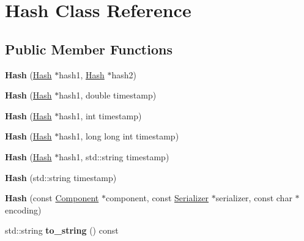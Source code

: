 \hypertarget{classHash}{}\section{Hash Class Reference}
\label{classHash}
\subsection*{Public Member Functions}
\begin{DoxyCompactItemize}
\item 
\mbox{\label{classHash_ac4eb7d20e99c6bd18e03ec77cf7a3607}} 
{\bfseries Hash} (\mbox{\hyperlink{classHash}{Hash}} $\ast$hash1, \mbox{\hyperlink{classHash}{Hash}} $\ast$hash2)
\item 
\mbox{\label{classHash_a2b45e505dc1cd9a72dee423f413feb4c}} 
{\bfseries Hash} (\mbox{\hyperlink{classHash}{Hash}} $\ast$hash1, double timestamp)
\item 
\mbox{\label{classHash_a1344901b761ddb969b29d074c8fc735e}} 
{\bfseries Hash} (\mbox{\hyperlink{classHash}{Hash}} $\ast$hash1, int timestamp)
\item 
\mbox{\label{classHash_adf6e09b4e5846f14803ee2733c473d24}} 
{\bfseries Hash} (\mbox{\hyperlink{classHash}{Hash}} $\ast$hash1, long long int timestamp)
\item 
\mbox{\label{classHash_a1c75a351f34806ab7a662e8b64f49070}} 
{\bfseries Hash} (\mbox{\hyperlink{classHash}{Hash}} $\ast$hash1, std\+::string timestamp)
\item 
\mbox{\label{classHash_af82bf941eec6e91bda4b3c0fa1a5c2bd}} 
{\bfseries Hash} (std\+::string timestamp)
\item 
\mbox{\label{classHash_a1d2f0230c2cfe4d6aaab6d9a055faaf5}} 
{\bfseries Hash} (const \mbox{\hyperlink{classComponent}{Component}} $\ast$component, const \mbox{\hyperlink{classSerializer}{Serializer}} $\ast$serializer, const char $\ast$encoding)
\item 
\mbox{\label{classHash_ab1c275871d3d81cd38d58dac5c634042}} 
std\+::string {\bfseries to\+\_\+string} () const
\item 

\end{DoxyCompactItemize}
